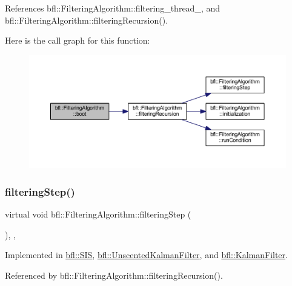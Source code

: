 References bfl\+::\+Filtering\+Algorithm\+::filtering\+\_\+thread\+\_\+, and bfl\+::\+Filtering\+Algorithm\+::filtering\+Recursion().

Here is the call graph for this function\+:
\nopagebreak
\begin{figure}[H]
\begin{center}
\leavevmode
\includegraphics[width=350pt]{classbfl_1_1FilteringAlgorithm_a96651f8464190c0a56d79219a1017147_cgraph}
\end{center}
\end{figure}
\mbox{\label{classbfl_1_1FilteringAlgorithm_ab3bceb43b5810a4bf1da884b8a0b145a}} 
\subsubsection{\texorpdfstring{filtering\+Step()}{filteringStep()}}
{\footnotesize\ttfamily virtual void bfl\+::\+Filtering\+Algorithm\+::filtering\+Step (\begin{DoxyParamCaption}{ }\end{DoxyParamCaption})\hspace{0.3cm}{\ttfamily [protected]}, {}, {\ttfamily [inherited]}}



Implemented in \mbox{\hyperlink{classbfl_1_1SIS_a582f06cc5456d2cc6ed8f90087cbbb4c}{bfl\+::\+S\+IS}}, \mbox{\hyperlink{classbfl_1_1UnscentedKalmanFilter_a169451bb711a03ad2dc28a40e3ad867f}{bfl\+::\+Unscented\+Kalman\+Filter}}, and \mbox{\hyperlink{classbfl_1_1KalmanFilter_aac6bd54422cba06e34cb93cb8a659950}{bfl\+::\+Kalman\+Filter}}.



Referenced by bfl\+::\+Filtering\+Algorithm\+::filtering\+Recursion().

